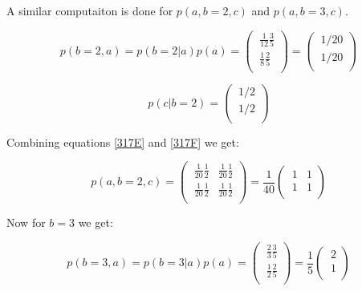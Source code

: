 \documentclass[11pt,a4paper,oneside]{report}
\begin{document}
A similar computaiton is done for $p(a, b = 2, c)$ and $p(a, b = 3, c)$. 


\begin{equation}
\label{317E}
    p(b = 2, a) = p(b = 2|a) p(a) = 
    \begin{pmatrix}
      \ \frac{1}{12} \frac{3}{5} \\[0.4em]
      \ \frac{1}{8} \frac{2}{5} \\
    \end{pmatrix} = 
    \begin{pmatrix}
      \ 1/20 \\[0.4em]
      \ 1/20 \\
    \end{pmatrix}
\end{equation}

\begin{equation}
\label{317F}
p(c | b = 2) =  
  \begin{pmatrix}
   \ 1/2 \\[0.4em]
   \ 1/2 \\
 \end{pmatrix} 
\end{equation}

Combining equations \eqref{317E} and \eqref{317F} we get:

\begin{equation}
\label{317G}
p(a, b = 2, c) =  
  \begin{pmatrix}
   \ \frac{1}{20} \frac{1}{2} & \frac{1}{20} \frac{1}{2} \\[0.4em]
   \ \frac{1}{20} \frac{1}{2} & \frac{1}{20} \frac{1}{2} \\
 \end{pmatrix} = \frac{1}{40}
  \begin{pmatrix}
   \ 1 & 1 \\[0.4em]
   \ 1 & 1 \\
 \end{pmatrix} 
\end{equation}


Now for $b = 3$ we get:

\begin{equation}
\label{317H}
    p(b = 3, a) = p(b = 3|a) p(a) = 
    \begin{pmatrix}
      \ \frac{2}{3} \frac{3}{5} \\[0.4em]
      \ \frac{1}{2} \frac{2}{5} \\
    \end{pmatrix} = \frac{1}{5}
    \begin{pmatrix}
      \ 2 \\[0.4em]
      \ 1 \\
    \end{pmatrix}
\end{equation}
\end{document}
